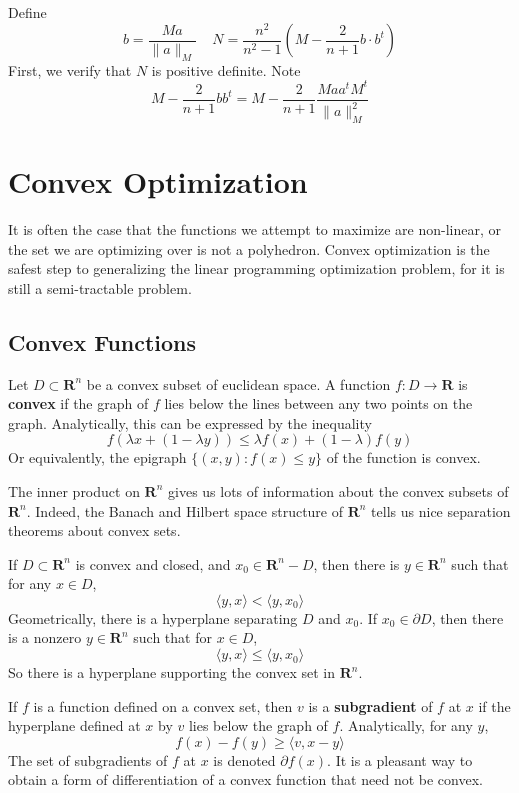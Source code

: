 Define
%
\[ b = \frac{Ma}{\|a\|_M}\ \ \ \ \ N = \frac{n^2}{n^2 - 1} (M - \frac{2}{n+1} b \cdot b^t) \]
%
First, we verify that $N$ is positive definite. Note
%
\[ M - \frac{2}{n+1} bb^t = M - \frac{2}{n+1} \frac{Maa^tM^t}{\|a\|_M^2} \]



\part{Convex Optimization}

It is often the case that the functions we attempt to maximize are non-linear, or the set we are optimizing over is not a polyhedron. Convex optimization is the safest step to generalizing the linear programming optimization problem, for it is still a semi-tractable problem.

\chapter{Convex Functions}

Let $D \subset \mathbf{R}^n$ be a convex subset of euclidean space. A function $f: D \to \mathbf{R}$ is {\bf convex} if the graph of $f$ lies below the lines between any two points on the graph. Analytically, this can be expressed by the inequality
%
\[ f(\lambda x + (1 - \lambda y)) \leq \lambda f(x) + (1 - \lambda) f(y) \]
%
Or equivalently, the epigraph $\{ (x,y): f(x) \leq y \}$ of the function is convex.

The inner product on $\mathbf{R}^n$ gives us lots of information about the convex subsets of $\mathbf{R}^n$. Indeed, the Banach and Hilbert space structure of $\mathbf{R}^n$ tells us nice separation theorems about convex sets.

\begin{theorem}
    If $D \subset \mathbf{R}^n$ is convex and closed, and $x_0 \in \mathbf{R}^n - D$, then there is $y \in \mathbf{R}^n$ such that for any $x \in D$,
    \[ \langle y, x \rangle < \langle y, x_0 \rangle \]
    Geometrically, there is a hyperplane separating $D$ and $x_0$. If $x_0 \in \partial D$, then there is a nonzero $y \in \mathbf{R}^n$ such that for $x \in D$,
    \[ \langle y, x \rangle \leq \langle y, x_0 \rangle \]
    So there is a hyperplane supporting the convex set in $\mathbf{R}^n$.
\end{theorem}

If $f$ is a function defined on a convex set, then $v$ is a {\bf subgradient} of $f$ at $x$ if the hyperplane defined at $x$ by $v$ lies below the graph of $f$. Analytically, for any $y$,
%
\[ f(x) - f(y) \geq \langle v, x - y \rangle \]
%
The set of subgradients of $f$ at $x$ is denoted $\partial f(x)$. It is a pleasant way to obtain a form of differentiation of a convex function that need not be convex.


